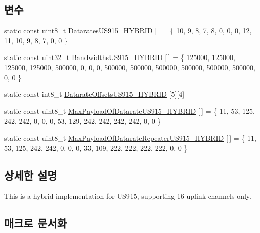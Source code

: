 \subsection*{변수}
\begin{DoxyCompactItemize}
\item 
static const uint8\+\_\+t \mbox{\hyperlink{group___r_e_g_i_o_n_u_s915_h_y_b_ga72c443cba5429b7ee2bff33f70fc8aec}{Datarates\+U\+S915\+\_\+\+H\+Y\+B\+R\+ID}} \mbox{[}$\,$\mbox{]} = \{ 10, 9, 8, 7, 8, 0, 0, 0, 12, 11, 10, 9, 8, 7, 0, 0 \}
\item 
static const uint32\+\_\+t \mbox{\hyperlink{group___r_e_g_i_o_n_u_s915_h_y_b_gada3976d142cb9c990e9af2567ff8ecca}{Bandwidths\+U\+S915\+\_\+\+H\+Y\+B\+R\+ID}} \mbox{[}$\,$\mbox{]} = \{ 125000, 125000, 125000, 125000, 500000, 0, 0, 0, 500000, 500000, 500000, 500000, 500000, 500000, 0, 0 \}
\item 
static const int8\+\_\+t \mbox{\hyperlink{group___r_e_g_i_o_n_u_s915_h_y_b_ga5a529866ea886b5f171f6c49fb7fdbcd}{Datarate\+Offsets\+U\+S915\+\_\+\+H\+Y\+B\+R\+ID}} \mbox{[}5\mbox{]}\mbox{[}4\mbox{]}
\item 
static const uint8\+\_\+t \mbox{\hyperlink{group___r_e_g_i_o_n_u_s915_h_y_b_ga0165d0e904aef148daa7b87353f58aca}{Max\+Payload\+Of\+Datarate\+U\+S915\+\_\+\+H\+Y\+B\+R\+ID}} \mbox{[}$\,$\mbox{]} = \{ 11, 53, 125, 242, 242, 0, 0, 0, 53, 129, 242, 242, 242, 242, 0, 0 \}
\item 
static const uint8\+\_\+t \mbox{\hyperlink{group___r_e_g_i_o_n_u_s915_h_y_b_ga57e0d330c0e1458e1523d826e1874b7a}{Max\+Payload\+Of\+Datarate\+Repeater\+U\+S915\+\_\+\+H\+Y\+B\+R\+ID}} \mbox{[}$\,$\mbox{]} = \{ 11, 53, 125, 242, 242, 0, 0, 0, 33, 109, 222, 222, 222, 222, 0, 0 \}
\end{DoxyCompactItemize}


\subsection{상세한 설명}
This is a hybrid implementation for U\+S915, supporting 16 uplink channels only. 

\subsection{매크로 문서화}
\mbox{\label{group___r_e_g_i_o_n_u_s915_h_y_b_ga559607e0b707cb0266b55efa2eb38a79}} 
